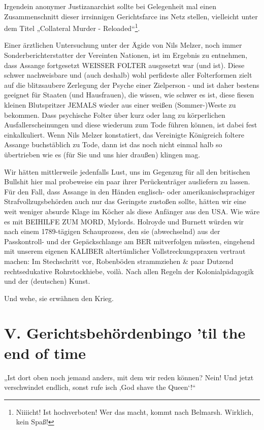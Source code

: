 \begin{multicols}{2}
Irgendein anonymer Justizanarchist sollte bei Gelegenheit mal einen Zusammenschnitt dieser irrsinnigen Gerichtsfarce ins Netz stellen, vielleicht unter dem Titel
„Collateral Murder - Reloaded“\footnote[35]{Niiiicht! Ist hochverboten! Wer das macht, kommt nach Belmarsh. Wirklich, kein Spaß!}.

Einer ärztlichen Untersuchung unter der Ägide von Nils
Melzer, noch immer Sonderberichterstatter der Vereinten Nationen, ist im Ergebnis zu entnehmen, dass Assange fortgesetzt WEISSER FOLTER ausgesetzt war (und
ist). Diese schwer nachweisbare und (auch deshalb)
wohl perfideste aller Folterformen zielt auf die blitzsaubere Zerlegung der Psyche einer Zielperson - und ist daher bestens geeignet für Staaten (und Hausfrauen), die
wissen, wie schwer es ist, diese fiesen kleinen Blutspritzer JEMALS wieder aus einer weißen (Sommer-)Weste zu
bekommen. Dass psychische Folter über kurz oder lang
zu körperlichen Ausfallerscheinungen und diese wiederum zum Tode führen können, ist dabei fest einkalkuliert.
Wenn Nils Melzer konstatiert, das Vereinigte Königreich
foltere Assange buchstäblich zu Tode, dann ist das noch
nicht einmal halb so übertrieben wie es (für Sie und uns
hier draußen) klingen mag.

Wir hätten mittlerweile jedenfalls Lust, uns im Gegenzug für all den britischen Bullshit hier mal probeweise
ein paar ihrer Perückenträger ausliefern zu lassen. Für
den Fall, dass Assange in den Händen englisch- oder
amerikanischsprachiger Strafvollzugsbehörden auch
nur das Geringste zustoßen sollte, hätten wir eine weit
weniger absurde Klage im Köcher als diese Anfänger
aus den USA. Wie wäre es mit BEIHILFE ZUM MORD,
Mylords. Holroyde und Burnett würden wir nach einem
1789-tägigen Schauprozess, den sie (abwechselnd) aus
der Passkontroll- und der Gepäckschlange am BER mitverfolgen müssten, eingehend mit unserem eigenen KALIBER altertümlicher Vollstreckungspraxen vertraut machen: Im Stechschritt vor, Robenböden strammziehen
\& paar Dutzend rechtsedukative Rohrstockhiebe, voilà.
Nach allen Regeln der Kolonialpädagogik und der (deutschen) Kunst.

Und wehe, sie erwähnen den Krieg.


\section{V. Gerichtsbehördenbingo ’til the end of time}
\epigraph{„Ist dort oben noch jemand anders, mit dem wir reden können?
Nein! Und jetzt verschwindet endlich, sonst rufe isch ‚God shave the Queen‘!“}{}


\end{multicols}
